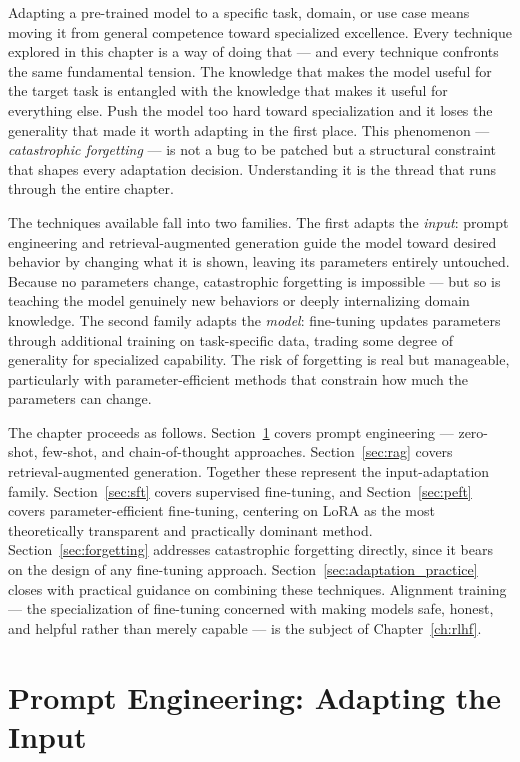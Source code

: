 \documentclass{book}
\begin{document}
Adapting a pre-trained model to a specific task, domain, or use case means
moving it from general competence toward specialized excellence. Every
technique explored in this chapter is a way of doing that --- and every
technique confronts the same fundamental tension. The knowledge that makes
the model useful for the target task is entangled with the knowledge that
makes it useful for everything else. Push the model too hard toward
specialization and it loses the generality that made it worth adapting in
the first place. This phenomenon --- \emph{catastrophic forgetting} --- is
not a bug to be patched but a structural constraint that shapes every
adaptation decision. Understanding it is the thread that runs through the
entire chapter.

The techniques available fall into two families. The first adapts the
\emph{input}: prompt engineering and retrieval-augmented generation guide
the model toward desired behavior by changing what it is shown, leaving its
parameters entirely untouched. Because no parameters change, catastrophic
forgetting is impossible --- but so is teaching the model genuinely new
behaviors or deeply internalizing domain knowledge. The second family adapts
the \emph{model}: fine-tuning updates parameters through additional training
on task-specific data, trading some degree of generality for specialized
capability. The risk of forgetting is real but manageable, particularly
with parameter-efficient methods that constrain how much the parameters can
change.

The chapter proceeds as follows. Section~\ref{sec:prompt_engineering} covers
prompt engineering --- zero-shot, few-shot, and chain-of-thought approaches.
Section~\ref{sec:rag} covers retrieval-augmented generation. Together these
represent the input-adaptation family. Section~\ref{sec:sft} covers supervised
fine-tuning, and Section~\ref{sec:peft} covers parameter-efficient fine-tuning,
centering on LoRA as the most theoretically transparent and practically
dominant method. Section~\ref{sec:forgetting} addresses catastrophic
forgetting directly, since it bears on the design of any fine-tuning
approach. Section~\ref{sec:adaptation_practice} closes with practical
guidance on combining these techniques. Alignment training --- the
specialization of fine-tuning concerned with making models safe, honest,
and helpful rather than merely capable --- is the subject of
Chapter~\ref{ch:rlhf}.

\section{Prompt Engineering: Adapting the Input}
\label{sec:prompt_engineering}
\end{document}
